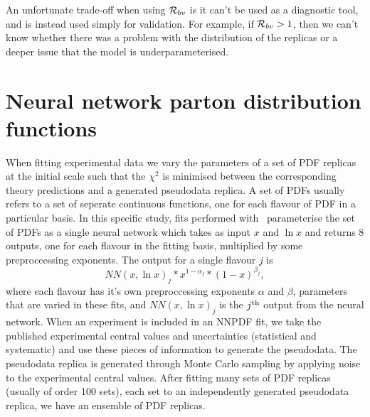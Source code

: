 An unfortunate
trade-off when using $\mathcal{R}_{bv}$ is it can't be used as a diagnostic
tool, and is instead used simply for validation. For example, if
$\mathcal{R}_{bv} > 1$, then we
can't know whether there was a problem with the distribution of the replicas
or a deeper issue that the model is underparameterised.

\section{Neural network parton distribution functions}

When fitting experimental data we vary the parameters of a set of PDF replicas
at the initial scale such that the $\chi^2$ is minimised between the
corresponding theory predictions and a generated pseudodata replica. A set of
PDFs usually refers to a set of seperate continuous functions, one for each
flavour of PDF in a particular basis. In this specific study, fits performed
with \nfit\ parameterise the set of PDFs as a single neural network which takes
as input $x$ and $\ln x$ and returns 8 outputs, one for each flavour in the
fitting basis, multiplied by some preproccessing exponents. The output for a
single flavour $j$ is
\begin{equation}
    NN(x, \ln x)_j * x^{1-\alpha_j} * (1-x)^{\beta_j},
\end{equation}
where each flavour has it's own preproccessing exponents $\alpha$ and $\beta$,
parameters that are varied in these fits, and $NN(x, \ln x)_j$ is the
$j^{\rm th}$ output from the neural network.
When an experiment is included in an NNPDF fit, we take the published
experimental central values and uncertainties (statistical and systematic)
and use these pieces of information to generate the pseudodata.
The pseudodata replica is generated
through Monte Carlo sampling by applying noise to the experimental
central values.
After fitting many sets of PDF replicas (usually of order 100 sets),
each set to an independently generated pseudodata replica, we have an ensemble of
PDF replicas.
